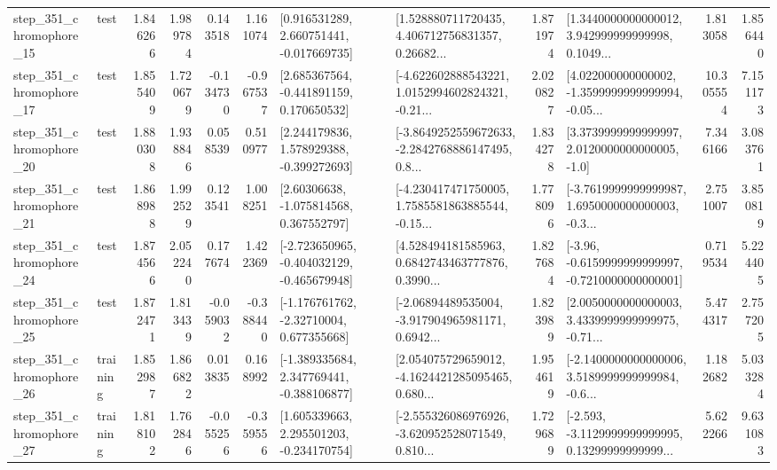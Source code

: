 \begin{tabular}{llrrrrllrlrr}
  step\_351\_chromophore\_15 &      test &      1.846266 &    1.989784 &      0.143518 &  1.161074 &    [0.916531289, 2.660751441, -0.017669735] &  [1.528880711720435, 4.406712756831357, 0.26682... &       1.871974 &  [1.3440000000000012, 3.942999999999998, 0.1049... &            1.813058 &          1.856440 \\
  step\_351\_chromophore\_17 &      test &      1.855409 &    1.720679 &     -0.134730 & -0.967537 &    [2.685367564, -0.441891159, 0.170650532] &  [-4.622602888543221, 1.0152994602824321, -0.21... &       2.020827 &  [4.022000000000002, -1.3599999999999994, -0.05... &           10.305554 &          7.151173 \\
  step\_351\_chromophore\_20 &      test &      1.880308 &    1.938846 &      0.058539 &  0.510977 &    [2.244179836, 1.578929388, -0.399272693] &  [-3.8649252559672633, -2.2842768886147495, 0.8... &       1.834278 &     [3.3739999999999997, 2.0120000000000005, -1.0] &            7.346166 &          3.083761 \\
  step\_351\_chromophore\_21 &      test &      1.868988 &    1.992529 &      0.123541 &  1.008251 &     [2.60306638, -1.075814568, 0.367552797] &  [-4.230417471750005, 1.7585581863885544, -0.15... &       1.778096 &  [-3.7619999999999987, 1.6950000000000003, -0.3... &            2.751007 &          3.850819 \\
  step\_351\_chromophore\_24 &      test &      1.874566 &    2.052240 &      0.177674 &  1.422369 &  [-2.723650965, -0.404032129, -0.465679948] &  [4.528494181585963, 0.6842743463777876, 0.3990... &       1.827684 &  [-3.96, -0.6159999999999997, -0.7210000000000001] &            0.719534 &          5.224405 \\
  step\_351\_chromophore\_25 &      test &      1.872471 &    1.813439 &     -0.059032 & -0.388440 &    [-1.176761762, -2.32710004, 0.677355668] &  [-2.06894489535004, -3.917904965981171, 0.6942... &       1.823989 &  [2.0050000000000003, 3.4339999999999975, -0.71... &            5.474317 &          2.757205 \\
  step\_351\_chromophore\_26 &  training &      1.852987 &    1.866822 &      0.013835 &  0.168992 &   [-1.389335684, 2.347769441, -0.388106877] &  [2.054075729659012, -4.1624421285095465, 0.680... &       1.954619 &  [-2.1400000000000006, 3.5189999999999984, -0.6... &            1.182682 &          5.033284 \\
  step\_351\_chromophore\_27 &  training &      1.818102 &    1.762846 &     -0.055256 & -0.359556 &    [1.605339663, 2.295501203, -0.234170754] &  [-2.555326086976926, -3.620952528071549, 0.810... &       1.729689 &  [-2.593, -3.1129999999999995, 0.13299999999999... &            5.622266 &          9.631083 \\

\end{tabular}
